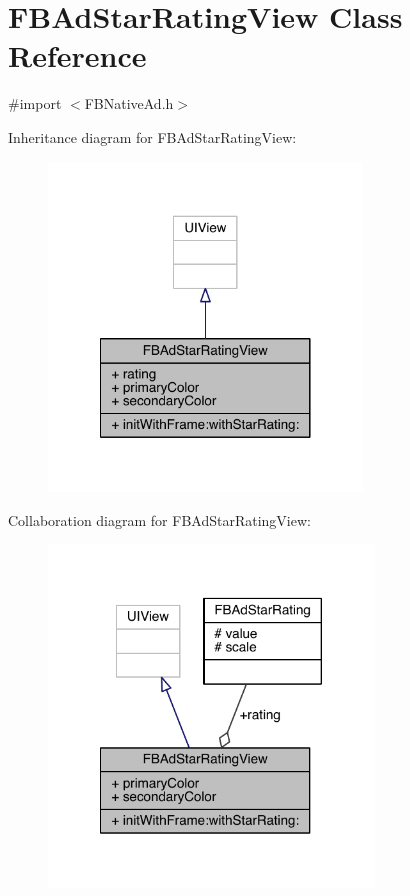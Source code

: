 \hypertarget{interface_f_b_ad_star_rating_view}{\section{F\-B\-Ad\-Star\-Rating\-View Class Reference}
\label{interface_f_b_ad_star_rating_view}
}


{\ttfamily \#import $<$F\-B\-Native\-Ad.\-h$>$}



Inheritance diagram for F\-B\-Ad\-Star\-Rating\-View\-:
\nopagebreak
\begin{figure}[H]
\begin{center}
\leavevmode
\includegraphics[width=236pt]{interface_f_b_ad_star_rating_view__inherit__graph}
\end{center}
\end{figure}


Collaboration diagram for F\-B\-Ad\-Star\-Rating\-View\-:
\nopagebreak
\begin{figure}[H]
\begin{center}
\leavevmode
\includegraphics[width=245pt]{interface_f_b_ad_star_rating_view__coll__graph}
\end{center}
\end{figure}
